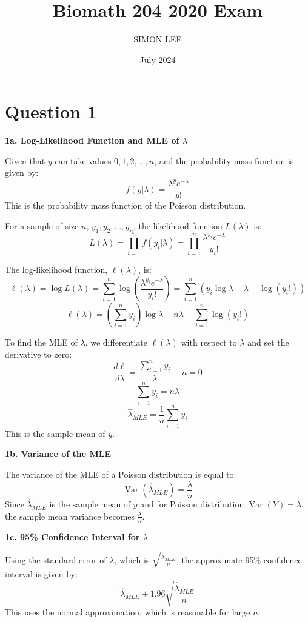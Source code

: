 \documentclass{article}
\title{Biomath 204 2020 Exam}
\author{SIMON LEE}
\date{July 2024}
\begin{document}
\maketitle

\section{Question 1}

\textbf{1a. Log-Likelihood Function and MLE of \(\lambda\)}

Given that \(y\) can take values \(0, 1, 2, \ldots, n\), and the probability mass function is given by:
\[
f(y|\lambda) = \frac{\lambda^y e^{-\lambda}}{y!}
\]
This is the probability mass function of the Poisson distribution.

For a sample of size \(n\), \(y_1, y_2, \ldots, y_n\), the likelihood function \(L(\lambda)\) is:
\[
L(\lambda) = \prod_{i=1}^n f(y_i|\lambda) = \prod_{i=1}^n \frac{\lambda^{y_i} e^{-\lambda}}{y_i!}
\]

The log-likelihood function, \(\ell(\lambda)\), is:
\[
\ell(\lambda) = \log L(\lambda) = \sum_{i=1}^n \log\left(\frac{\lambda^{y_i} e^{-\lambda}}{y_i!}\right) = \sum_{i=1}^n \left(y_i \log \lambda - \lambda - \log (y_i!)\right)
\]
\[
\ell(\lambda) = \left(\sum_{i=1}^n y_i\right) \log \lambda - n\lambda - \sum_{i=1}^n \log(y_i!)
\]

To find the MLE of \(\lambda\), we differentiate \(\ell(\lambda)\) with respect to \(\lambda\) and set the derivative to zero:
\[
\frac{d\ell}{d\lambda} = \frac{\sum_{i=1}^n y_i}{\lambda} - n = 0
\]
\[
\sum_{i=1}^n y_i = n\lambda
\]
\[
\hat{\lambda}_{MLE} = \frac{1}{n} \sum_{i=1}^n y_i
\]
This is the sample mean of \(y\).

\textbf{1b. Variance of the MLE}

The variance of the MLE of a Poisson distribution is equal to:
\[
\operatorname{Var}(\hat{\lambda}_{MLE}) = \frac{\lambda}{n}
\]
Since \(\hat{\lambda}_{MLE}\) is the sample mean of \(y\) and for Poisson distribution \( \operatorname{Var}(Y) = \lambda \), the sample mean variance becomes \( \frac{\lambda}{n} \).

\textbf{1c. 95\% Confidence Interval for \(\lambda\)}

Using the standard error of \(\lambda\), which is \(\sqrt{\frac{\hat{\lambda}_{MLE}}{n}}\), the approximate 95\% confidence interval is given by:
\[
\hat{\lambda}_{MLE} \pm 1.96 \sqrt{\frac{\hat{\lambda}_{MLE}}{n}}
\]
This uses the normal approximation, which is reasonable for large \(n\).
\end{document}
